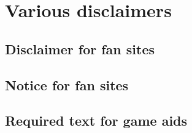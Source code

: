 \documentclass{article}
\begin{document}


\section{Various disclaimers}
\label{sec:various-disclaimers}

\subsection{Disclaimer for fan sites}
\label{sec:disclaimer-fan-sites}

\SJGamesOnlinePolicyDisclaimer

\subsection{Notice for fan sites}
\label{sec:disclaimer-fan-sites}

\SJGamesOnlinePolicyNotice

\subsection{Required text for game aids}
\label{sec:disclaimer-fan-sites}

\end{document}
